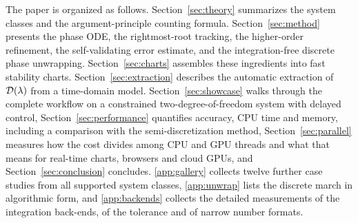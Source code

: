 The paper is organized as follows. Section~\ref{sec:theory} summarizes the
system classes and the argument-principle counting formula.
Section~\ref{sec:method} presents the phase ODE, the rightmost-root tracking,
the higher-order refinement, the self-validating error estimate, and the
integration-free discrete phase unwrapping.
Section~\ref{sec:charts} assembles these ingredients into fast stability
charts. Section~\ref{sec:extraction} describes the automatic extraction of
$\mathcal{D}(\lambda)$ from a time-domain model. Section~\ref{sec:showcase} walks
through the complete workflow on a constrained two-degree-of-freedom system
with delayed control, Section~\ref{sec:performance} quantifies accuracy, CPU
time and memory, including a comparison with the semi-discretization method,
Section~\ref{sec:parallel} measures how the cost divides among CPU and GPU
threads and what that means for real-time charts, browsers and cloud GPUs,
and Section~\ref{sec:conclusion} concludes. \ref{app:gallery} collects twelve
further case studies from all supported system classes,
\ref{app:unwrap} lists the discrete march in algorithmic form, and
\ref{app:backends} collects the detailed measurements of the integration
back-ends, of the tolerance and of narrow number formats.